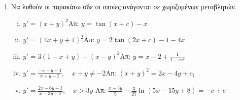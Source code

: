 \begin{enumerate}

  \item Να λυθούν οι παρακάτω σδε οι οποίες ανάγονται σε χωριζομένων μεταβλητών.

    \begin{enumerate}[i)]
      \item $y'=(x+y)^2$\hfill Απ: $y=\tan (x+c)-x$
      \item $y'=(4x+y+1)^2$\hfill Απ: $y=2\tan(2x+c)-1-4x$
      \item $y'=3(1-x+y)+(x-y)^2$\hfill Απ: $y=x-2+\frac{1}{1-c \mathrm{e}^x}$
      \item $y'=\frac{-x-y+1}{x+y+2}, \quad x+y\neq -2$\hfill Απ: $(x+y)^2=2x-4y+c_1$
      \item $y'=\frac{2x-6y+3}{x-3y+1}, \quad x>3y$
        \hfill Απ: $\frac{x-3y}{5}-\frac{3}{25}\ln(5x-15y+8)=-c+c$
    \end{enumerate}
\end{enumerate}



